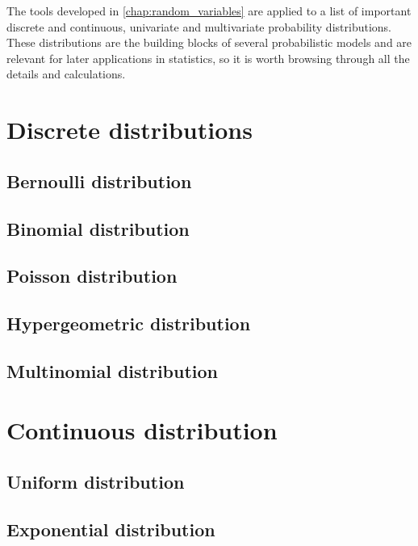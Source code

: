 


The tools developed in \cref{chap:random_variables} are applied to a list of
important discrete and continuous, univariate and multivariate probability distributions. 
These distributions are the building blocks of several probabilistic models and
are relevant for later applications in statistics, so it is worth browsing
through all the details and calculations. 

\section{Discrete distributions}

\subsection{Bernoulli distribution}
   \label{sec:bernoulli_distribution}
\subsection{Binomial distribution}
   \label{sec:binomial_distribution}
\subsection{Poisson distribution}
   \label{sec:poisson_distribution}
\subsection{Hypergeometric distribution}
   \label{sec:hypergeometric_distribution}
\subsection{Multinomial distribution}
   \label{sec:multinomial_distribution}


\section{Continuous distribution}

\subsection{Uniform distribution}
   \label{sec:uniform_distribution}
\subsection{Exponential distribution}
   \label{sec:exponential_distribution}
